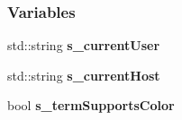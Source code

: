 \subsubsection*{Variables}
\begin{DoxyCompactItemize}
\item 
\hypertarget{a00190_ad0724db3d2fabea882fba2bcca773ebe}{}std\+::string {\bfseries s\+\_\+current\+User}\label{a00190_ad0724db3d2fabea882fba2bcca773ebe}

\item 
\hypertarget{a00190_abb6b1d2a4f838f734b6acba4a4cc15d3}{}std\+::string {\bfseries s\+\_\+current\+Host}\label{a00190_abb6b1d2a4f838f734b6acba4a4cc15d3}

\item 
\hypertarget{a00190_a3ab6c8c6cf5aa1bafee7bc34854f12ec}{}bool {\bfseries s\+\_\+term\+Supports\+Color}\label{a00190_a3ab6c8c6cf5aa1bafee7bc34854f12ec}

\end{DoxyCompactItemize}
